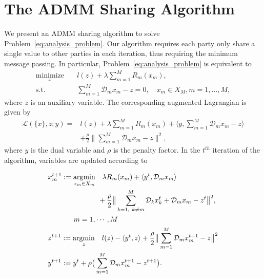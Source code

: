 \section{The ADMM Sharing Algorithm}
\label{sec:admmSharing}
We present an ADMM sharing algorithm \cite{boyd2011distributed,hong2016convergence} to solve Problem~\eqref{eq:analysis_problem}. Our algorithm requires each party only share a single value to other parties in each iteration, thus requiring the minimum message passing. 
In particular, Problem~\eqref{eq:analysis_problem} is equivalent to
\begin{align}
\underset{x}{\text{minimize}} &\quad l\left(z\right) + \lambda\sum_{m=1}^{M} R_m(x_m),\\
\text{s.t.} &\quad \sum_{m=1}^{M} \mathcal{D}_m x_m - z = 0,\quad x_m\in X_M, m=1,\ldots,M,
\end{align}
where $z$ is an auxiliary variable. 
The corresponding augmented Lagrangian is given by
\begin{align}
\mathcal{L}(\{x\}, z; y) =& l(z) + \lambda\sum_{m=1}^{M} R_m(x_m) + \langle y, \sum_{m=1}^{M}\mathcal{D}_m x_m - z\rangle \nonumber\\
    &+ \frac{\rho}{2}\|\sum_{m=1}^{M} \mathcal{D}_m x_m - z\|^2, \label{eq:lagragian}
\end{align}
where $y$ is the dual variable and $\rho$ is the penalty factor.
In the $t^{th}$ iteration of the algorithm, variables are updated according to

\begin{align}
&x_m^{t+1}:=\underset{x_m\in X_m}{\text{argmin}}\quad\lambda R_m(x_m) + \langle y^t, \mathcal{D}_mx_m\rangle\nonumber\\
& \quad\quad\quad\quad\quad\quad\quad+ \frac{\rho}{2}\big\|\sum_{\substack{k=1,~k\neq m}}^{M}\mathcal{D}_kx_k^{t} + \mathcal{D}_mx_m - z^t\big\|^2, \nonumber\\
&\hspace*{36pt} m=1,\cdots,M\label{eq:pal_algo_x}\\
&z^{t+1}:=\underset{z}{\text{argmin}}\quad l(z)  - \langle y^t, z \rangle + \frac{\rho}{2} \big\|\sum_{m=1}^{M}\mathcal{D}_mx_m^{t+1} - z\big\|^2\label{eq:pal_algo_z}\\
&y^{t+1}:=y^t + \rho\big(\sum_{m=1}^{M}\mathcal{D}_mx_m^{t+1} - z^{t+1}\big).\label{eq:pal_algo_y}
\end{align}

